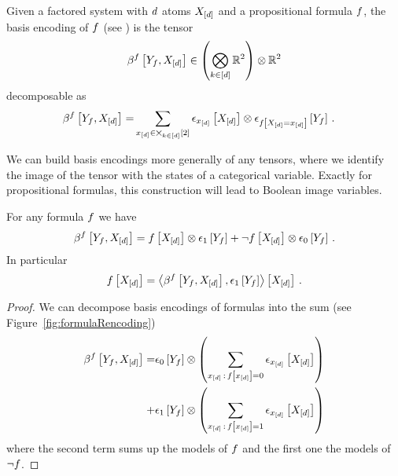 Given a factored system with $d$ atoms $X_{[d]}$ and a propositional formula $f$, the basis encoding of $f$ (see ) is the tensor
\begin{align*}
	\beta^{f}\left[Y_{f},X_{[d]}\right] \in  \left(\bigotimes_{k\in[d]}\mathbb{R}^2 \right) \otimes \mathbb{R}^2
\end{align*}
decomposable as
\begin{align} 
	\beta^{f}\left[Y_{f},X_{[d]}\right] 
	= & \sum_{x_{[d]}\in\bigtimes_{k\in[d]}[2]}  \epsilon_{x_{[d]}}\left[X_{[d]}\right] \otimes \epsilon_{f\left[X_{[d]}=x_{[d]}\right]}\left[Y_{f}\right] \, . 
\end{align}

We can build basis encodings more generally of any tensors, where we identify the image of the tensor with the states of a categorical variable.
Exactly for propositional formulas, this construction will lead to Boolean image variables.


\begin{lemma}\label{lem:formulaEncodingDecomposition}
	For any formula $f$ we have
	\begin{align*}
		\beta^{f}\left[Y_{f},X_{[d]}\right]
		= f\left[X_{[d]}\right] \otimes \epsilon_1\left[Y_{f}\right]
		+ \lnot f\left[X_{[d]}\right] \otimes  \epsilon_0\left[Y_{f}\right] \, .
	\end{align*}
	In particular
	\begin{align*}
		 f\left[X_{[d]}\right] = \left\langle 
		\beta^{f}\left[Y_{f},X_{[d]}\right],\epsilon_1\left[Y_{f}\right]
		\right\rangle \left[ X_{[d]} \right] \, .
	\end{align*}
\end{lemma}
\begin{proof}
	We can decompose basis encodings of formulas into the sum (see Figure~\ref{fig:formulaRencoding}) %
	\begin{align} 
		 \beta^{f}\left[Y_{f},X_{[d]}\right]  
		 = & \epsilon_0\left[Y_{f}\right] \otimes \left( \sum_{x_{[d]}\,:\,f\left[x_{[d]}\right]=0}  \epsilon_{x_{[d]}}\left[X_{[d]}\right] \right) \\
		 + & \epsilon_1\left[Y_{f}\right] \otimes \left( \sum_{x_{[d]}\,:\,f\left[x_{[d]}\right]=1}  \epsilon_{x_{[d]}}\left[X_{[d]}\right] \right)
	\end{align}
	where the second term sums up the models of $f$ and the first one the models of $\lnot f$.
\end{proof}


